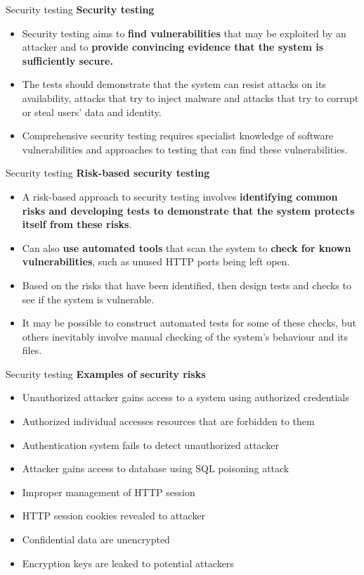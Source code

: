 \documentclass{beamer}
\begin{document}
\begin{frame}{Security testing}
	\textbf{Security testing}
	\begin{itemize}
		\item Security testing aims to \textbf{find vulnerabilities} that may be exploited by an attacker and to \textbf{provide convincing evidence that the system is sufficiently secure.} 
		\item The tests should demonstrate that the system can resist attacks on its availability, attacks that try to inject malware and attacks that try to corrupt or steal users’ data and identity.
		\item Comprehensive security testing requires specialist knowledge of software vulnerabilities and approaches to testing that can find these vulnerabilities. 
		
	\end{itemize}
\end{frame}
\begin{frame}{Security testing}
	\textbf{Risk-based security testing}
	\begin{itemize}
		\item A risk-based approach to security testing involves \textbf{identifying common risks and developing tests to demonstrate that the system protects itself from these risks}. 
		\item Can also \textbf{use automated tools} that scan the system to \textbf{check for known vulnerabilities}, such as unused HTTP ports being left open.
		\item Based on the risks that have been identified, then design tests and checks to see if the system is vulnerable. 
		\item It may be possible to construct automated tests for some of these checks, but others inevitably involve manual checking of the system’s behaviour and its files.
	\end{itemize}
\end{frame}
\begin{frame}{Security testing}
	\textbf{Examples of security risks}
	\begin{itemize}
		\item Unauthorized attacker gains access to a system using authorized credentials
		\item Authorized individual accesses resources that are forbidden to them
		\item Authentication system fails to detect unauthorized attacker
		\item Attacker gains access to database using SQL poisoning attack
		\item Improper management of HTTP session
		\item HTTP session cookies revealed to attacker
		\item Confidential data are unencrypted
		\item Encryption keys are leaked to potential attackers
		
	\end{itemize}
\end{frame}
\end{document}

